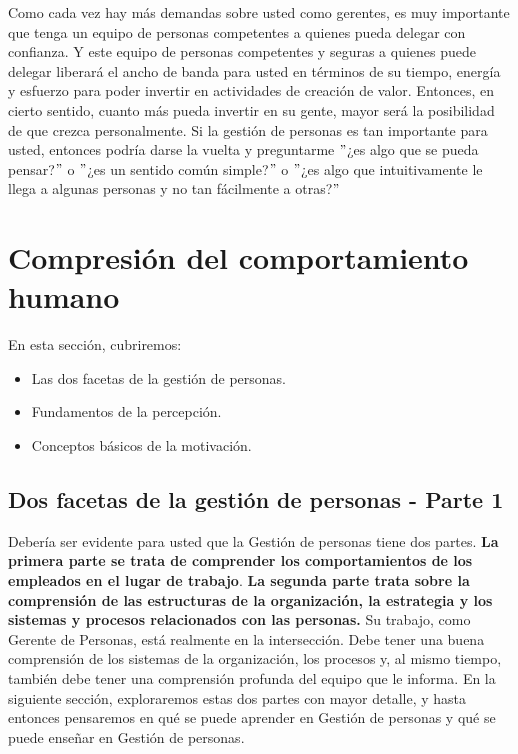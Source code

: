 \documentclass[10pt]{book}
\begin{document}
Como cada vez hay más demandas sobre usted como gerentes, es muy importante que tenga un equipo de personas competentes a quienes pueda delegar con confianza. Y este equipo de personas competentes y seguras a quienes puede delegar liberará el ancho de banda para usted en términos de su tiempo, energía y esfuerzo para poder invertir en actividades de creación de valor. Entonces, en cierto sentido, cuanto más pueda invertir en su gente, mayor será la posibilidad de que crezca personalmente. Si la gestión de personas es tan importante para usted, entonces podría darse la vuelta y preguntarme $"$¿es algo que se pueda pensar?$"$ o $"$¿es un sentido común simple?$"$ o $"$¿es algo que intuitivamente le llega a algunas personas y no tan fácilmente a otras?$"$
\section{Compresión del comportamiento humano}
En esta sección, cubriremos:
\begin{itemize}
\item Las dos facetas de la gestión de personas.
\item Fundamentos de la percepción.
\item Conceptos básicos de la motivación.
\end{itemize}
\subsection{Dos facetas de la gestión de personas - Parte 1}
Debería ser evidente para usted que la Gestión de personas tiene dos partes. \textbf{La primera parte se trata de comprender los comportamientos de los empleados en el lugar de trabajo}.\textbf{ La segunda parte trata sobre la comprensión de las estructuras de la organización, la estrategia y los sistemas y procesos relacionados con las personas.} Su trabajo, como Gerente de Personas, está realmente en la intersección. Debe tener una buena comprensión de los sistemas de la organización, los procesos y, al mismo tiempo, también debe tener una comprensión profunda del equipo que le informa. En la siguiente sección, exploraremos estas dos partes con mayor detalle, y hasta entonces pensaremos en qué se puede aprender en Gestión de personas y qué se puede enseñar en Gestión de personas.
\end{document}
